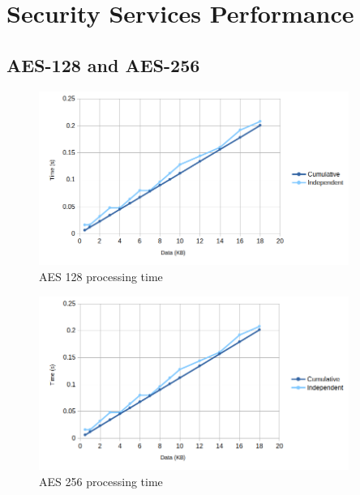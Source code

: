 \section{Security Services Performance}\label{chap:evaluation:cores}

\subsection{AES-128 and AES-256}\label{chap:evaluation:cores:aes}

\begin{figure}[h!]
	\centering
	\includegraphics[width=0.9\textwidth]{./Images/aes128-compare.png}
	\caption{AES 128 processing time}
	\label{fig:performance:aes128-compare}
\end{figure}

\begin{figure}[h!]
	\centering
	\includegraphics[width=0.9\textwidth]{./Images/aes256-compare.png}
	\caption{AES 256 processing time}
	\label{fig:performance:aes128-compare}
\end{figure}

